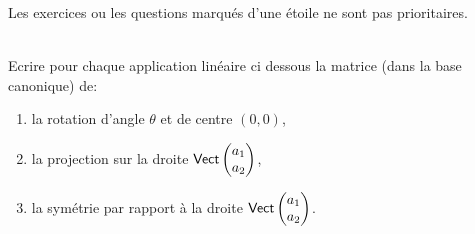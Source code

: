 Les exercices ou les questions marqués d'une étoile ne sont pas prioritaires.
\begin{td-exo}[Transformation de \(\bb R^2\)] \,\\%
	Ecrire pour chaque application linéaire ci dessous la matrice (dans la base canonique) de:
	\begin{enumerate}
		\item la rotation d'angle \(\theta\) et de centre \((0, 0)\),

		\item la projection sur la droite \(\operatorname{\mathsf{Vect}}\begin{pmatrix}
			a_1\\
			a_2
		\end{pmatrix}\),

		\item la symétrie par rapport à la droite \(\operatorname{\mathsf{Vect}}\begin{pmatrix}
			a_1\\
			a_2
		\end{pmatrix}\).
	\end{enumerate}
\end{td-exo}


